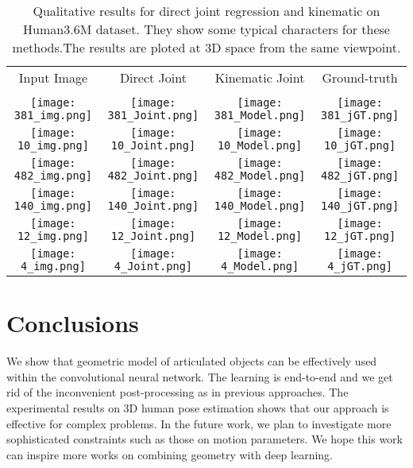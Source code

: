 \documentclass[runningheads]{llncs}
\begin{document}
\begin{table}
     \begin{center}
\begin{tabular}{ c c c c }


      Input Image & Direct Joint & Kinematic Joint& Ground-truth\\ \\
     \texttt{[image: 381\_img.png]}
      &\texttt{[image: 381\_Joint.png]}
      &\texttt{[image: 381\_Model.png]}
      &\texttt{[image: 381\_jGT.png]}
      \\ \texttt{[image: 10\_img.png]}
      &\texttt{[image: 10\_Joint.png]}
      &\texttt{[image: 10\_Model.png]}
      &\texttt{[image: 10\_jGT.png]}
      \\ \texttt{[image: 482\_img.png]}
      &\texttt{[image: 482\_Joint.png]}
      &\texttt{[image: 482\_Model.png]}
      &\texttt{[image: 482\_jGT.png]}
      \\ \texttt{[image: 140\_img.png]}
      &\texttt{[image: 140\_Joint.png]}
      &\texttt{[image: 140\_Model.png]}
      &\texttt{[image: 140\_jGT.png]}
      \\ \texttt{[image: 12\_img.png]}
      &\texttt{[image: 12\_Joint.png]}
      &\texttt{[image: 12\_Model.png]}
      &\texttt{[image: 12\_jGT.png]}
      \\ \texttt{[image: 4\_img.png]}
      &\texttt{[image: 4\_Joint.png]}
      &\texttt{[image: 4\_Model.png]}
      &\texttt{[image: 4\_jGT.png]}
      \\ \end{tabular}
      \caption{Qualitative results for direct joint regression and kinematic on Human3.6M dataset. They show some typical characters for these methods.The results are ploted at 3D space from the same viewpoint.}
      \label{table:demo}
      \end{center}
\end{table}




\section{Conclusions}
We show that geometric model of articulated objects can be effectively used within the convolutional neural network. The learning is end-to-end and we get rid of the inconvenient post-processing as in previous approaches. The experimental results on 3D human pose estimation shows that our approach is effective for complex problems. In the future work, we plan to investigate more sophisticated constraints such as those on motion parameters. We hope this work can inspire more works on combining geometry with deep learning.
\end{document}
